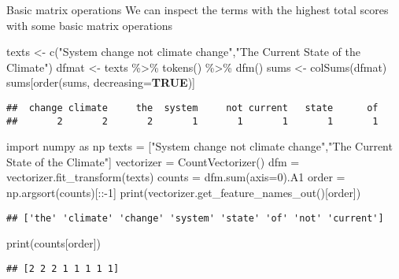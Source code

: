 \documentclass[
  10pt,
  ignorenonframetext,
  aspectratio=169]{beamer}
\newenvironment{Shaded}{\begin{snugshade}}{\end{snugshade}}
\newcommand{\AttributeTok}[1]{\textcolor[rgb]{0.80,0.80,0.80}{#1}}
\newcommand{\BuiltInTok}[1]{\textcolor[rgb]{0.80,0.80,0.80}{#1}}
\newcommand{\ConstantTok}[1]{\textcolor[rgb]{0.86,0.64,0.64}{\textbf{#1}}}
\newcommand{\DecValTok}[1]{\textcolor[rgb]{0.86,0.86,0.80}{#1}}
\newcommand{\FunctionTok}[1]{\textcolor[rgb]{0.94,0.94,0.56}{#1}}
\newcommand{\ImportTok}[1]{\textcolor[rgb]{0.80,0.80,0.80}{#1}}
\newcommand{\NormalTok}[1]{\textcolor[rgb]{0.80,0.80,0.80}{#1}}
\newcommand{\OperatorTok}[1]{\textcolor[rgb]{0.94,0.94,0.82}{#1}}
\newcommand{\OtherTok}[1]{\textcolor[rgb]{0.94,0.94,0.56}{#1}}
\newcommand{\SpecialCharTok}[1]{\textcolor[rgb]{0.86,0.64,0.64}{#1}}
\newcommand{\StringTok}[1]{\textcolor[rgb]{0.80,0.58,0.58}{#1}}
\begin{document}
\begin{frame}[fragile]{Basic matrix operations}
\protect\hypertarget{basic-matrix-operations}{}
We can inspect the terms with the highest total scores with some basic
matrix operations

\scriptsize

\begin{Shaded}
\begin{Highlighting}[]
\NormalTok{texts }\OtherTok{\textless{}{-}} \FunctionTok{c}\NormalTok{(}\StringTok{"System change not climate change"}\NormalTok{,}\StringTok{"The Current State of the Climate"}\NormalTok{)}
\NormalTok{dfmat }\OtherTok{\textless{}{-}}\NormalTok{ texts }\SpecialCharTok{\%\textgreater{}\%} \FunctionTok{tokens}\NormalTok{() }\SpecialCharTok{\%\textgreater{}\%} \FunctionTok{dfm}\NormalTok{()}
\NormalTok{sums }\OtherTok{\textless{}{-}} \FunctionTok{colSums}\NormalTok{(dfmat)}
\NormalTok{sums[}\FunctionTok{order}\NormalTok{(sums, }\AttributeTok{decreasing=}\ConstantTok{TRUE}\NormalTok{)]}
\end{Highlighting}
\end{Shaded}

\begin{verbatim}
##  change climate     the  system     not current   state      of 
##       2       2       2       1       1       1       1       1
\end{verbatim}

\begin{Shaded}
\begin{Highlighting}[]
\ImportTok{import}\NormalTok{ numpy }\ImportTok{as}\NormalTok{ np}
\NormalTok{texts }\OperatorTok{=}\NormalTok{ [}\StringTok{"System change not climate change"}\NormalTok{,}\StringTok{"The Current State of the Climate"}\NormalTok{]}
\NormalTok{vectorizer }\OperatorTok{=}\NormalTok{ CountVectorizer()}
\NormalTok{dfm }\OperatorTok{=}\NormalTok{ vectorizer.fit\_transform(texts)}
\NormalTok{counts }\OperatorTok{=}\NormalTok{ dfm.}\BuiltInTok{sum}\NormalTok{(axis}\OperatorTok{=}\DecValTok{0}\NormalTok{).A1}
\NormalTok{order }\OperatorTok{=}\NormalTok{ np.argsort(counts)[::}\OperatorTok{{-}}\DecValTok{1}\NormalTok{]}
\BuiltInTok{print}\NormalTok{(vectorizer.get\_feature\_names\_out()[order])}
\end{Highlighting}
\end{Shaded}

\begin{verbatim}
## ['the' 'climate' 'change' 'system' 'state' 'of' 'not' 'current']
\end{verbatim}

\begin{Shaded}
\begin{Highlighting}[]
\BuiltInTok{print}\NormalTok{(counts[order])}
\end{Highlighting}
\end{Shaded}

\begin{verbatim}
## [2 2 2 1 1 1 1 1]
\end{verbatim}
\end{frame}
\end{document}
